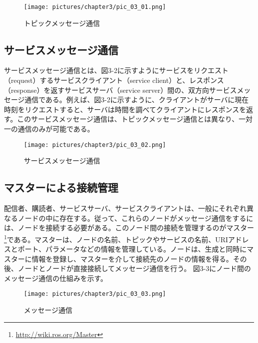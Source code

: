 \begin{figure}[h]
  \centering
  \texttt{[image: pictures/chapter3/pic\_03\_01.png]}
  \caption{トピックメッセージ通信}
\end{figure}

\subsection{サービスメッセージ通信}
サービスメッセージ通信とは、図3-2に示すようにサービスをリクエスト（request）するサービスクライアント（service client）と、レスポンス（response）を返すサービスサーバ（service server）間の、双方向サービスメッセージ通信である。例えば、図3-2に示すように、クライアントがサーバに現在時刻をリクエストすると、サーバは時間を調べてクライアントにレスポンスを返す。このサービスメッセージ通信は、トピックメッセージ通信とは異なり、一対一の通信のみが可能である。

\begin{figure}[h]
  \centering
  \texttt{[image: pictures/chapter3/pic\_03\_02.png]}
  \caption{サービスメッセージ通信}
\end{figure}

\subsection{マスターによる接続管理}

配信者、購読者、サービスサーバ、サービスクライアントは、一般にそれぞれ異なるノードの中に存在する。従って、これらのノードがメッセージ通信をするには、ノードを接続する必要がある。このノード間の接続を管理するのがマスター\footnote{\url{http://wiki.ros.org/Master}}である。マスターは、ノードの名前、トピックやサービスの名前、URIアドレスとポート、パラメータなどの情報を管理している。ノードは、生成と同時にマスターに情報を登録し、マスターを介して接続先のノードの情報を得る。その後、ノードとノードが直接接続してメッセージ通信を行う。
図3-3にノード間のメッセージ通信の仕組みを示す。

\begin{figure}[h]
  \centering
  \texttt{[image: pictures/chapter3/pic\_03\_03.png]}
  \caption{メッセージ通信}
\end{figure}

